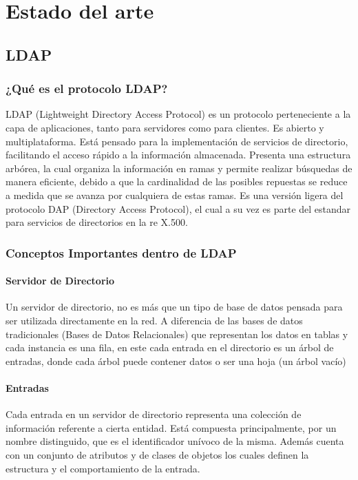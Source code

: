 \chapter{Estado del arte}

\section{LDAP}
\subsection{¿Qu\'e es el protocolo LDAP?}
LDAP (Lightweight Directory Access Protocol) es un protocolo perteneciente a la capa de aplicaciones, tanto para servidores como para clientes. Es abierto y multiplataforma. Est\'a pensado para la implementaci\'on de servicios de directorio, facilitando el acceso r\'apido a la informaci\'on almacenada. Presenta una estructura arbórea, la cual organiza la informaci\'on en ramas y permite realizar b\'usquedas de manera eficiente, debido a que la cardinalidad de las posibles repuestas se reduce a medida que se avanza por cualquiera de estas ramas. Es una versi\'on ligera del protocolo DAP (Directory Access Protocol), el cual a su vez es parte del estandar para servicios de directorios en la re X.500. 

\subsection{Conceptos Importantes dentro de LDAP}
\subsubsection{Servidor de Directorio}
Un servidor de directorio, no es m\'as que un tipo de base de datos pensada para ser utilizada directamente en la red. A diferencia de las bases de datos tradicionales (Bases de Datos Relacionales) que representan los datos en tablas y cada instancia es una fila, en este cada entrada en el directorio es un \'arbol de entradas, donde cada \'arbol puede contener datos o ser una hoja (un \'arbol vac\'io)
\subsubsection{Entradas}
Cada entrada en un servidor de directorio representa una colecci\'on de informaci\'on referente a cierta entidad. Est\'a compuesta principalmente, por un nombre distinguido, que es el identificador un\'ivoco de la misma. Adem\'as cuenta con un conjunto de atributos y de clases de objetos los cuales definen la estructura y el comportamiento de la entrada.
